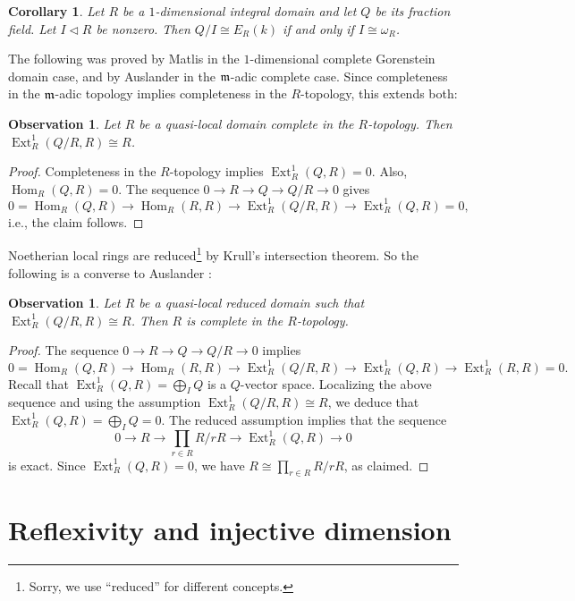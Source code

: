 \documentclass[10. pt,a4paper]{amsart}
\newtheorem{corollary}[theorem]{Corollary}
\newtheorem{observation}[theorem]{Observation}
\theoremstyle{definition}
\theoremstyle{remark}
\newcommand{\Ext}{\operatorname{Ext}}
\newcommand{\Hom}{\operatorname{Hom}}
\newcommand{\fm}{\frak{m}}
\begin{document}
\begin{corollary}
	Let $R$ be a $1$-dimensional integral domain and let $Q$ be its fraction field. Let $I \lhd R$ be nonzero. Then $Q / I \cong E_R(k)$ if and only if $I \cong \omega_R$.
\end{corollary}

The following was proved by Matlis in the $1$-dimensional complete Gorenstein domain case, and by Auslander \cite{comment} in the $\fm$-adic complete case. Since completeness in the $\fm$-adic topology implies completeness in the $R$-topology, this extends both:

\begin{observation}
	Let $R$ be a quasi-local domain complete in the $R$-topology. Then $\Ext^1_R(Q/R, R) \cong R$.
\end{observation}

\begin{proof}
	Completeness in the $R$-topology implies $\Ext^1_R(Q, R) = 0$. Also, $\Hom_R(Q, R) = 0$. The sequence $0 \to R \to Q \to Q/R \to 0$ gives
	\[
	0 = \Hom_R(Q, R) \to \Hom_R(R, R) \to \Ext^1_R(Q/R, R) \to \Ext^1_R(Q, R) = 0,
	\]
	i.e., the claim follows.
\end{proof}

Noetherian local rings are reduced\footnote{Sorry, we use ``reduced'' for different concepts.} by Krull's intersection theorem. So the following is a converse to Auslander \cite{comment}:

\begin{observation}\label{CON}
	Let $R$ be a quasi-local reduced domain such that $\Ext^1_R(Q/R, R) \cong R$. Then $R$ is complete in the $R$-topology.
\end{observation}

\begin{proof}
	The sequence $0 \to R \to Q \to Q/R \to 0$ implies
	\[
	0 = \Hom_R(Q, R) \to \Hom_R(R, R) \to \Ext^1_R(Q/R, R) \to \Ext^1_R(Q, R) \to \Ext^1_R(R, R) = 0.
	\]
	Recall that $\Ext^1_R(Q, R) = \bigoplus_I Q$ is a $Q$-vector space. Localizing the above sequence and using the assumption $\Ext^1_R(Q/R, R) \cong R$, we deduce that $\Ext^1_R(Q, R) = \bigoplus_I Q = 0$. The reduced assumption implies that the sequence
	\[
	0 \to R \to \prod_{r \in R} R/rR \to \Ext^1_R(Q, R) \to 0
	\]
	is exact. Since $\Ext^1_R(Q, R) = 0$, we have $R \cong \prod_{r \in R} R/rR$, as claimed.
\end{proof}

\medskip
\section{Reflexivity and injective dimension}
\end{document}
